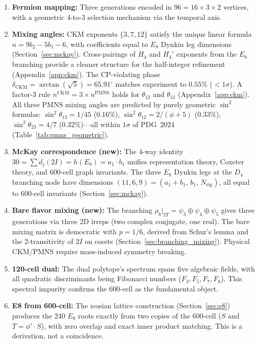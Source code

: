 \documentclass[12pt,a4paper]{article}
\begin{document}
\begin{enumerate}
    \item \textbf{Fermion mapping:} Three generations encoded in $96 = 16 \times 3 \times 2$ vertices, with a geometric 4-to-3 selection mechanism via the temporal axis.

    \item \textbf{Mixing angles:} CKM exponents $\{3, 7, 12\}$ satisfy the unique linear formula $n = 9b_2 - 5b_1 - 6$, with coefficients equal to $E_8$ Dynkin leg dimensions (Section~\ref{sec:mckay}). Cross-pairings of $H_4$ and $H_4'$ exponents from the $E_8$ branching provide a cleaner structure for the half-integer refinement (Appendix~\ref{app:ckm}). The CP-violating phase $\delta_{\text{CKM}} = \arctan(\sqrt{5}) = 65.91^\circ$ matches experiment to $0.55\%$ ($< 1\sigma$). A factor-3 rule $n^{\text{CKM}} = 3 \times n^{\text{PMNS}}$ holds for $\theta_{12}$ and $\theta_{13}$ (Appendix~\ref{app:ckm}). All three PMNS mixing angles are predicted by purely geometric $\sin^2$ formulas: $\sin^2\theta_{13} = 1/45$ ($0.16\%$), $\sin^2\theta_{12} = 2/(\phi+5)$ ($0.33\%$), $\sin^2\theta_{23} = 4/7$ ($0.32\%$)---all within $1\sigma$ of PDG~2024 (Table~\ref{tab:pmns_geometric}).

    \item \textbf{McKay correspondence (new):} The 4-way identity $30 = \sum d_j(2I) = h(E_8) = a_1 \cdot b_1$ unifies representation theory, Coxeter theory, and 600-cell graph invariants. The three $E_8$ Dynkin legs at the $D_4$ branching node have dimensions $(11, 6, 9) = (a_1 + b_1,\, b_1,\, N_{\text{eig}})$, all equal to 600-cell invariants (Section~\ref{sec:mckay}).

    \item \textbf{Bare flavor mixing (new):} The branching $\rho_8|_{2T} = \psi_3 \oplus \psi_4 \oplus \psi_5$ gives three generations via three 2D irreps (two complex conjugate, one real). The bare mixing matrix is democratic with $p = 1/6$, derived from Schur's lemma and the 2-transitivity of $2I$ on cosets (Section~\ref{sec:branching_mixing}). Physical CKM/PMNS require mass-induced symmetry breaking.

    \item \textbf{120-cell dual:} The dual polytope's spectrum spans five algebraic fields, with all quadratic discriminants being Fibonacci numbers ($F_3, F_5, F_7, F_8$). This spectral impurity confirms the 600-cell as the fundamental object.

    \item \textbf{E8 from 600-cell:} The icosian lattice construction (Section~\ref{sec:e8}) produces the 240 $E_8$ roots exactly from two copies of the 600-cell ($S$ and $T = \phi' \cdot S$), with zero overlap and exact inner product matching. This is a derivation, not a coincidence.


\end{enumerate}
\end{document}
